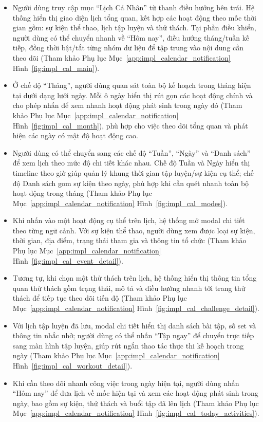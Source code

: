 \begin{itemize}
    \item Người dùng truy cập mục ``Lịch Cá Nhân'' từ thanh điều hướng bên trái. Hệ thống hiển thị giao diện lịch tổng quan, kết hợp các hoạt động theo mốc thời gian gồm: sự kiện thể thao, lịch tập luyện và thử thách. Tại phần điều khiển, người dùng có thể chuyển nhanh về ``Hôm nay'', điều hướng tháng/tuần kế tiếp, đồng thời bật/tắt từng nhóm dữ liệu để tập trung vào nội dung cần theo dõi (Tham khảo Phụ lục Mục~\ref{app:impl_calendar_notification} Hình~\ref{fig:impl_cal_main}).


    \item Ở chế độ ``Tháng'', người dùng quan sát toàn bộ kế hoạch trong tháng hiện tại dưới dạng lưới ngày. Mỗi ô ngày hiển thị rút gọn các hoạt động chính và cho phép nhấn để xem nhanh hoạt động phát sinh trong ngày đó (Tham khảo Phụ lục Mục~\ref{app:impl_calendar_notification} Hình~\ref{fig:impl_cal_month}), phù hợp cho việc theo dõi tổng quan và phát hiện các ngày có mật độ hoạt động cao.


    \item Người dùng có thể chuyển sang các chế độ ``Tuần'', ``Ngày'' và ``Danh sách'' để xem lịch theo mức độ chi tiết khác nhau. Chế độ Tuần và Ngày hiển thị timeline theo giờ giúp quản lý khung thời gian tập luyện/sự kiện cụ thể; chế độ Danh sách gom sự kiện theo ngày, phù hợp khi cần quét nhanh toàn bộ hoạt động trong tháng (Tham khảo Phụ lục Mục~\ref{app:impl_calendar_notification} Hình~\ref{fig:impl_cal_modes}).


    \item Khi nhấn vào một hoạt động cụ thể trên lịch, hệ thống mở modal chi tiết theo từng ngữ cảnh. Với sự kiện thể thao, người dùng xem được loại sự kiện, thời gian, địa điểm, trạng thái tham gia và thông tin tổ chức (Tham khảo Phụ lục Mục~\ref{app:impl_calendar_notification} Hình~\ref{fig:impl_cal_event_detail}).


    \item Tương tự, khi chọn một thử thách trên lịch, hệ thống hiển thị thông tin tổng quan thử thách gồm trạng thái, mô tả và điều hướng nhanh tới trang thử thách để tiếp tục theo dõi tiến độ (Tham khảo Phụ lục Mục~\ref{app:impl_calendar_notification} Hình~\ref{fig:impl_cal_challenge_detail}).


    \item Với lịch tập luyện đã lưu, modal chi tiết hiển thị danh sách bài tập, số set và thông tin nhắc nhở; người dùng có thể nhấn ``Tập ngay'' để chuyển trực tiếp sang màn hình tập luyện, giúp rút ngắn thao tác thực thi kế hoạch trong ngày (Tham khảo Phụ lục Mục~\ref{app:impl_calendar_notification} Hình~\ref{fig:impl_cal_workout_detail}).


    \item Khi cần theo dõi nhanh công việc trong ngày hiện tại, người dùng nhấn ``Hôm nay'' để đưa lịch về mốc hiện tại và xem các hoạt động phát sinh trong ngày, bao gồm sự kiện, thử thách và buổi tập đã lên lịch (Tham khảo Phụ lục Mục~\ref{app:impl_calendar_notification} Hình~\ref{fig:impl_cal_today_activities}).

\end{itemize}

